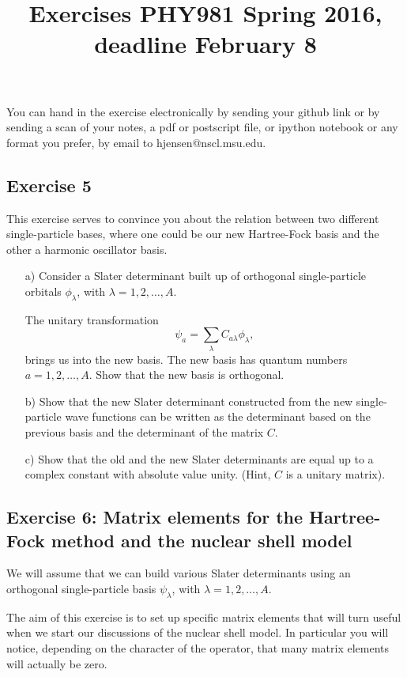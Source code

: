 \documentclass[prc]{revtex4}
\begin{document}
\title{Exercises PHY981 Spring 2016, deadline February 8}
\maketitle
You can hand in the exercise  electronically by sending your github link or by sending a scan of your notes, a pdf or postscript file, or ipython notebook or any format you prefer,  by email to 
hjensen@nscl.msu.edu. 


\subsection*{Exercise 5}
This exercise serves to convince you about the relation between
two different single-particle bases, where one could be our new Hartree-Fock basis and the other a harmonic oscillator basis.
\begin{enumerate}
\item[a)]
Consider a Slater determinant built up of orthogonal single-particle orbitals $\phi_{\lambda}$, 
with $\lambda = 1,2,\dots,A$.

The unitary transformation
\[
\psi_a  = \sum_{\lambda} C_{a\lambda}\phi_{\lambda},
\]
brings us into the new basis.  
The new basis has quantum numbers $a=1,2,\dots,A$.
Show that the new basis is orthogonal.
\item[b)]  
Show that the new Slater determinant constructed from the new single-particle wave functions can be
written as the determinant based on the previous basis and the determinant of the matrix $C$.
\item[c)]  
Show that the old and the new Slater determinants are equal up to a complex constant with absolute value unity.
(Hint, $C$ is a unitary matrix). 
\end{enumerate}





\subsection*{Exercise 6: Matrix elements for the Hartree-Fock method and the nuclear shell model}


We will assume that we can build various Slater determinants using an orthogonal  single-particle basis $\psi_{\lambda}$, 
with $\lambda = 1,2,\dots,A$. 


The aim of this exercise is to set up specific matrix elements that will turn useful when we start our discussions of the nuclear shell model. In particular you will notice, depending on the character of the operator, that many matrix elements will actually be zero.
\end{document}
